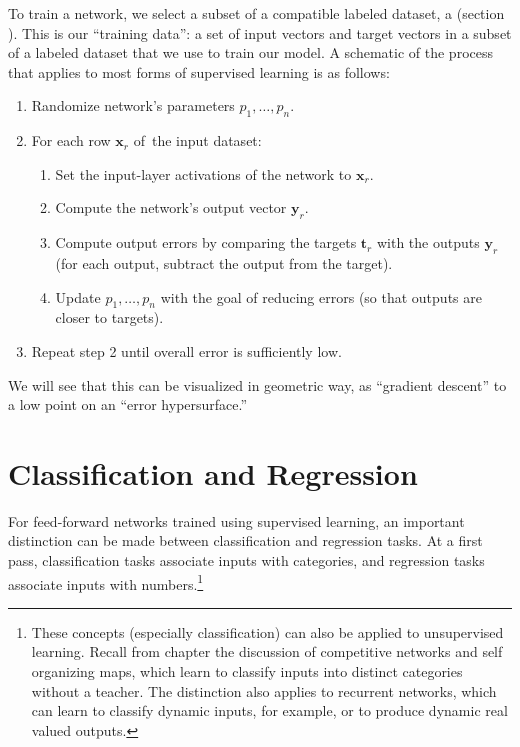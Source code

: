 To train a network, we select a subset of a compatible labeled dataset, a  (section ). This is our ``training data'': a set of input vectors and target vectors in a subset of a labeled dataset that we use to train our model. A schematic of the process that applies to most forms of supervised learning is as follows:
 \begin{enumerate}
\item Randomize network's parameters $p_1,\dots,p_n$.
\item For each row $\mathbf{x}_r$  of the input dataset:
\begin{enumerate}
\item Set the input-layer activations of the network to $\mathbf{x}_r$.
\item Compute the network's output vector $\mathbf{y}_r$. 
\item Compute output errors by comparing the targets $\mathbf{t}_r$ with the outputs $\mathbf{y}_r$ (for each output, subtract the output from the target).
\item Update $p_1,\dots, p_n$ with the goal of reducing errors (so that outputs are closer to targets).
\end{enumerate}
\item Repeat step 2 until overall error is sufficiently low.
\end{enumerate}
	

We will see that this can be visualized in geometric way, as ``gradient descent'' to a low point on an ``error hypersurface.''


\section{Classification and Regression}\label{classificationRegression}

For feed-forward networks trained using supervised learning, an important distinction can be made between classification and regression tasks. At a first pass, classification tasks associate inputs with categories, and regression tasks associate inputs with numbers.\footnote{These concepts (especially classification) can also be applied to unsupervised learning. Recall from chapter  the discussion of competitive networks and self organizing maps, which learn to classify inputs into distinct categories without a teacher. The distinction also applies to recurrent networks, which can learn to classify  dynamic inputs, for example, or to produce dynamic real valued outputs.} 

